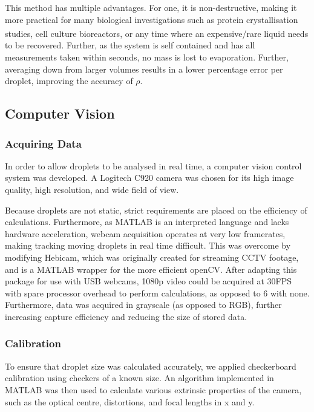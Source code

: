 \documentclass{physics_article_B}
\begin{document}
        This method has multiple advantages. For one, it is non-destructive, making it more practical for many biological investigations such as protein crystallisation  studies\textsuperscript{\cite{zhu}}, cell culture bioreactors\textsuperscript{\cite{konry}}, or any time where an expensive/rare liquid needs to be recovered\cite{Backholm2017}. Further, as the system is self contained and has all measurements taken within seconds, no mass is lost to evaporation. Further, averaging down from larger volumes results in a lower percentage error per droplet, improving the accuracy of $\rho$.
        
    \subsection{Computer Vision\label{sect:method:vision}}
        
        \subsubsection{Acquiring Data\label{sect:method:vision:acquire}}
            In order to allow droplets to be analysed in real time, a computer vision control system was developed. A Logitech C920 camera was chosen for its high image quality, high resolution, and wide field of view. 
            
            Because droplets are not static, strict requirements are placed on the efficiency of calculations. Furthermore, as MATLAB is an interpreted language and lacks hardware acceleration, webcam acquisition operates at very low framerates, making tracking moving droplets in real time difficult. This was overcome by modifying Hebicam\cite{HebiCam}, which was originally created for streaming CCTV footage, and is a MATLAB wrapper for the more efficient openCV. After adapting this package for use with USB webcams, 1080p video could be acquired at 30FPS with spare processor overhead to perform calculations, as opposed to 6 with none. Furthermore, data was acquired in grayscale (as opposed to RGB), further increasing capture efficiency and reducing the size of stored data. 
            
    
        \subsubsection{Calibration\label{sect:method:vision:calib}}

            To ensure that droplet size was calculated accurately, we applied checkerboard calibration using checkers of a known size. An algorithm implemented in MATLAB\cite{CameraCalibration} was then used to calculate various extrinsic properties of the camera, such as the optical centre, distortions, and focal lengths in x and y. 
        
\end{document}
